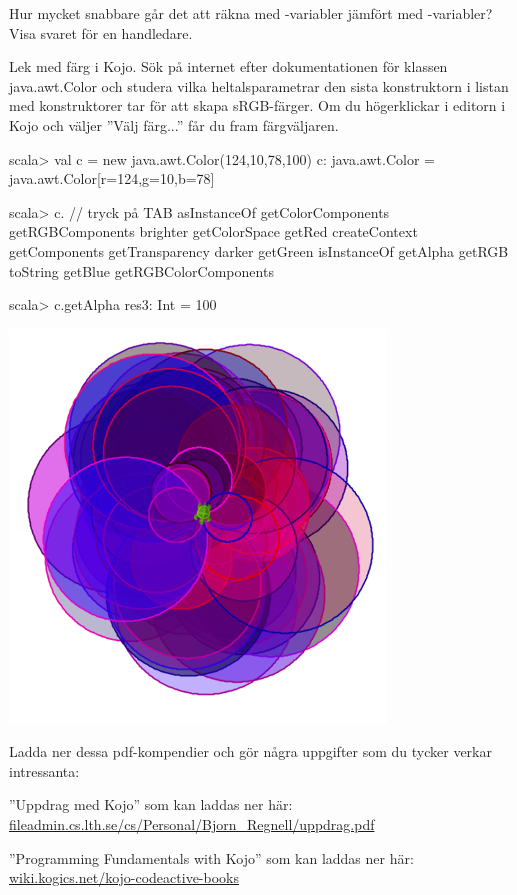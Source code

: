 \Subtask\Checkpoint Hur mycket snabbare går det att räkna med -variabler jämfört med -variabler? Visa svaret för en handledare.

\Task Lek med färg i Kojo. Sök på internet efter dokumentationen för klassen java.awt.Color och studera vilka heltalsparametrar den sista konstruktorn i listan med konstruktorer tar för att skapa sRGB-färger. Om du högerklickar i editorn i Kojo och väljer ''Välj färg...'' får du fram färgväljaren.

\begin{REPL}
scala> val c = new java.awt.Color(124,10,78,100)
c: java.awt.Color = java.awt.Color[r=124,g=10,b=78]

scala> c.  // tryck på TAB
asInstanceOf    getColorComponents      getRGBComponents   
brighter        getColorSpace           getRed             
createContext   getComponents           getTransparency    
darker          getGreen                isInstanceOf       
getAlpha        getRGB                  toString           
getBlue         getRGBColorComponents                      

scala> c.getAlpha
res3: Int = 100
\end{REPL}

\includegraphics[width=0.75\textwidth]{../img/kojo/random-color-circles.png}


\Task Ladda ner dessa pdf-kompendier och gör några uppgifter som du tycker verkar intressanta:

\Subtask ''Uppdrag med Kojo'' som kan laddas ner här:\\ \href{http://fileadmin.cs.lth.se/cs/Personal/Bjorn_Regnell/uppdrag.pdf}{fileadmin.cs.lth.se/cs/Personal/Bjorn\_Regnell/uppdrag.pdf}

\Subtask ''Programming Fundamentals with Kojo'' som kan laddas ner här:\\
 \href{http://wiki.kogics.net/kojo-codeactive-books}{wiki.kogics.net/kojo-codeactive-books}
